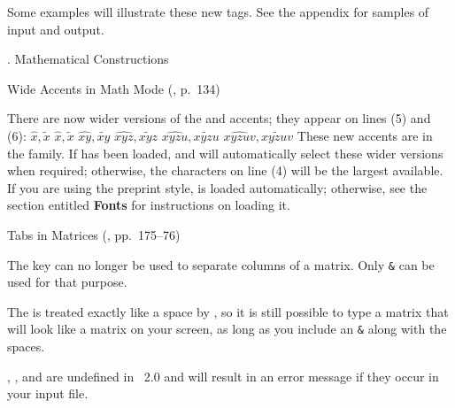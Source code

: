 Some examples will illustrate these new tags.  See the appendix for
samples of input and output.



. Mathematical Constructions
\endhead

\subhead Wide Accents in Math Mode {\rm (\Joy, p.~134)}
\endsubhead

There are now wider versions of the  and 
accents; they appear on lines (5) and (6):
\beginexample{}
 $\hat x, \tilde x$
 $\widehat x, \widetilde x$
  $\widehat{xy}, \widetilde{xy}$
  $\widehat{xyz}, \widetilde{xyz}$
  $\widehat{xyzu}, \widetilde{xyzu}$
  $\widehat{xyzuv}, \widetilde{xyzuv}$
\endexample
\noindent
These new accents are in the  family.  If 
has been loaded,  and  will automatically
select these wider versions when required; otherwise, the characters
on line (4) will be the largest available.  If you are using the
preprint style,  is loaded automatically; otherwise,
see the section entitled {\bf Fonts} for instructions on loading it.


\subhead Tabs in Matrices {\rm (\Joy, pp.~175--76)}
\endsubhead

The \tab{} key can no longer be used to separate
columns of a matrix.  Only {\tt\&} can be used for that purpose.

The \tab{} is treated exactly like a space by \AmSTeX, so it is still
possible to type a matrix that will look like a matrix on your screen,
as long as you include an {\tt\&} along with the spaces.

, ,  and
 are undefined in \AmSTeX~2.0 and will result in an
error message if they occur in your input file.


